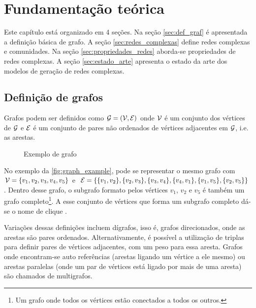 \documentclass[notes.tex]{subfiles}
\begin{document}
\chapter{Fundamentação teórica}

Este capítulo está organizado em 4 seções.
Na seção \ref{sec:def_graf} é apresentada a definição básica de grafo.
A seção \ref{sec:redes_complexas} define redes complexas e comunidades.
Na seção \ref{sec:propriedades_redes} aborda-se propriedades de redes complexas.
A seção \ref{sec:estado_arte} apresenta o estado da arte dos modelos de geração de redes complexas.

\section{Definição de grafos\label{sec:def_graf}}

Grafos podem ser definidos como $\operatorname{\mathcal{G}} = (\operatorname{\mathcal{V}}, \operatorname{\mathcal{E}})$ onde $\operatorname{\mathcal{V}}$ é um conjunto dos vértices de  $\operatorname{\mathcal{G}}$ e  $\operatorname{\mathcal{E}}$ é um conjunto de pares não ordenados de vértices adjacentes em $\operatorname{\mathcal{G}}$, i.e. as arestas.

\begin{figure}[htpb]
    \centering
    \caption{Exemplo de grafo}\label{fig:graph_example}
\end{figure}

No exemplo da \autoref{fig:graph_example}, pode se representar o mesmo grafo com $\operatorname{\mathcal{V}} = \{v_1, v_2, v_3, v_4, v_5\}$ e $\operatorname{\mathcal{E}} = \{\{v_1, v_2\}, \{v_2, v_3\}, \{v_3, v_4\}, \{v_4, v_1\}, \{v_1, v_5\}, \{v_2, v_5\}\}$.
Dentro desse grafo, o subgrafo formato pelos vértices $v_1$, $v_2$ e $v_5$ é também um grafo completo\footnote{Um grafo onde todos os vértices estão conectados a todos os outros.}.
A esse conjunto de vértices que forma um subgrafo completo dá-se o nome de clique \cite{fortunato2010community}.

Variações dessas definições incluem dígrafos, isso é, grafos direcionados, onde as arestas são pares ordenados.
Alternativamente, é possível a utilização de triplas para definir pares de vértices adjacentes, com um peso para essa aresta.
Grafos onde encontram-se auto referências (arestas ligando um vértice a ele mesmo) ou arestas paralelas (onde um par de vértices está ligado por mais de uma aresta) são chamados de multigrafos.
\end{document}
